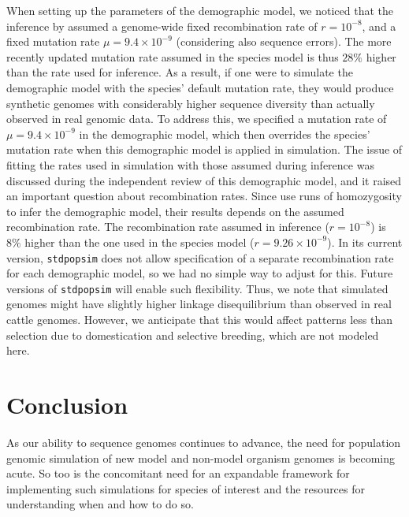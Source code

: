 \documentclass[hidelinks]{article}
\newcommand{\stdpopsim}{\texttt{stdpopsim}\xspace}
\begin{document}
When setting up the parameters of the demographic model, we noticed that the inference by \cite{MacLeod2013} assumed a genome-wide fixed recombination rate of \(r=10^{-8}\), and a fixed mutation rate \(\mu=9.4 \times 10^{-9}\) (considering also sequence errors).
%
The more recently updated mutation rate assumed in the species model \citep[\(1.2\times 10^{-8}\) from][as used above]{Harland2017}
is thus \(28\%\) higher than the rate used for inference.
%
As a result, if one were to simulate the demographic model with the species' default mutation rate, they would produce synthetic genomes with considerably higher sequence diversity than actually observed in real genomic data.
%
To address this, we specified a mutation rate of \(\mu=9.4 \times 10^{-9}\) in the demographic model,
which then overrides the species' mutation rate when this demographic model is applied in simulation.
%
%
The issue of fitting the rates used in simulation with those assumed during inference was discussed during the independent review of this demographic model, and it raised an important question about recombination rates. Since \cite{MacLeod2013} use runs of homozygosity to infer the demographic model, their results depends on the assumed recombination rate. The recombination rate assumed in inference (\(r=10^{-8}\)) is \(8\%\) higher than the one used in the species model (\(r=9.26\times 10^{-9}\)). In its current version, \stdpopsim does not allow specification of a separate recombination rate for each demographic model, so we had no simple way to adjust for this. Future versions of \stdpopsim will enable such flexibility. Thus, we note that simulated genomes might have slightly higher linkage disequilibrium than observed in real cattle genomes.
However, we anticipate that this would affect patterns less
than selection due to domestication and selective breeding,
which are not modeled here.

\section*{Conclusion}
    \label{conclusion}

As our ability to sequence genomes continues to advance, the need for
population genomic simulation of new model and non-model organism genomes is
becoming acute. So too is the concomitant need for an expandable framework
for implementing such simulations for species of interest and
the resources for understanding when and how to do so.
\end{document}
